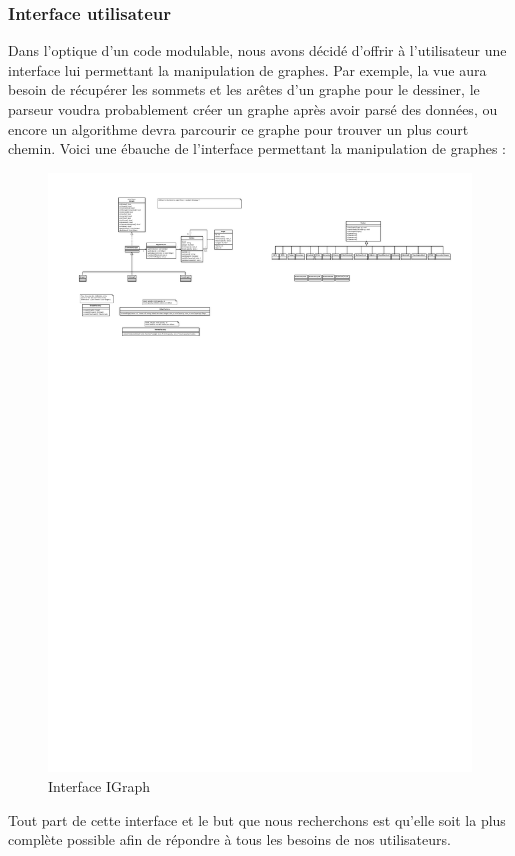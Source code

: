 \documentclass[french]{article}
\begin{document}
			\subsubsection{Interface utilisateur}
			Dans l'optique d'un code modulable, nous avons décidé d'offrir à l'utilisateur une interface lui permettant la manipulation de graphes. Par exemple, la vue aura besoin de récupérer les sommets et les arêtes d'un graphe pour le dessiner, le parseur voudra probablement créer un graphe après avoir parsé des données, ou encore un algorithme devra parcourir ce graphe pour trouver un plus court chemin.
			Voici une ébauche de l'interface permettant la manipulation de graphes :
			\begin{figure}[H]
				\centering
				\includegraphics[scale=3.0]{Conception/igraph.pdf}
				\caption{Interface IGraph}
			\end{figure}
			Tout part de cette interface et le but que nous recherchons est qu'elle soit la plus complète possible afin de répondre à tous les besoins de nos utilisateurs. \\
			
\end{document}
